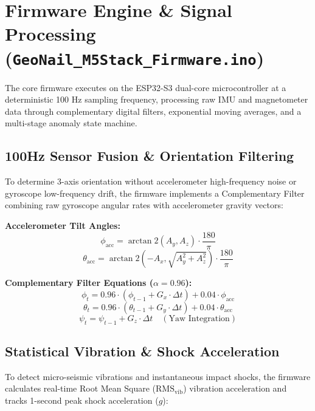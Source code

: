 \documentclass[11pt,a4paper]{article}
\begin{document}
\section{Firmware Engine \& Signal Processing (\texttt{GeoNail\_M5Stack\_Firmware.ino})}

The core firmware executes on the ESP32-S3 dual-core microcontroller at a deterministic 100 Hz sampling frequency, processing raw IMU and magnetometer data through complementary digital filters, exponential moving averages, and a multi-stage anomaly state machine.

\subsection{100Hz Sensor Fusion \& Orientation Filtering}
To determine 3-axis orientation without accelerometer high-frequency noise or gyroscope low-frequency drift, the firmware implements a Complementary Filter combining raw gyroscope angular rates with accelerometer gravity vectors:

\begin{mathbox}
\textbf{Accelerometer Tilt Angles:}
\begin{equation}
\phi_{\text{acc}} = \arctan2(A_y, A_z) \cdot \frac{180}{\pi}
\end{equation}
\begin{equation}
\theta_{\text{acc}} = \arctan2\left(-A_x, \sqrt{A_y^2 + A_z^2}\right) \cdot \frac{180}{\pi}
\end{equation}

\textbf{Complementary Filter Equations ($\alpha = 0.96$):}
\begin{equation}
\phi_t = 0.96 \cdot (\phi_{t-1} + G_x \cdot \Delta t) + 0.04 \cdot \phi_{\text{acc}}
\end{equation}
\begin{equation}
\theta_t = 0.96 \cdot (\theta_{t-1} + G_y \cdot \Delta t) + 0.04 \cdot \theta_{\text{acc}}
\end{equation}
\begin{equation}
\psi_t = \psi_{t-1} + G_z \cdot \Delta t \quad (\text{Yaw Integration})
\end{equation}
\end{mathbox}

\subsection{Statistical Vibration \& Shock Acceleration}
To detect micro-seismic vibrations and instantaneous impact shocks, the firmware calculates real-time Root Mean Square ($\text{RMS}_{\text{vib}}$) vibration acceleration and tracks 1-second peak shock acceleration ($g$):
\end{document}
